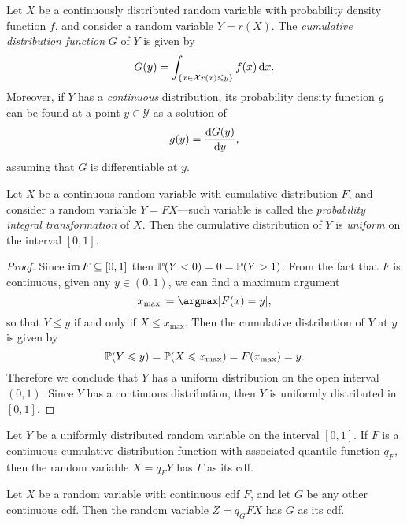\begin{proposition}
\label{prop:fn-of-rand-var-continuous-case}
Let \(X\) be a continuously distributed random variable with probability density
function \(f\), and consider a random variable \(Y = r(X)\). The
\emph{cumulative distribution function} \(G\) of \(Y\) is given by
\[
G(y) = \int_{\{x \in \mathcal{X} \relax r(x) \leqslant y\}} f(x)\, \mathrm{d} x.
\]
Moreover, if \(Y\) has a \emph{continuous} distribution, its probability
density function \(g\) can be found at a point \(y \in \mathcal{Y}\) as a solution of
\[
g(y) = \frac{\mathrm{d} G(y)}{\mathrm{d} y},
\]
assuming that \(G\) is differentiable at \(y\).
\end{proposition}

\begin{proposition}
\label{prop:probability-integral-transformation}
Let \(X\) be a continuous random variable with cumulative distribution \(F\),
and consider a random variable \(Y = F X\)---such variable is called the
\emph{probability integral transformation} of \(X\). Then the cumulative
distribution of \(Y\) is \emph{uniform} on the interval \([0, 1]\).
\end{proposition}

\begin{proof}
Since \(\operatorname{im} F \subseteq [0, 1]\) then \(\operatorname{\mathbb{P}}(Y < 0) = 0 = \operatorname{\mathbb{P}}(Y > 1)\). From
the fact that \(F\) is continuous, given any \(y \in (0, 1)\), we can find a
maximum argument
\[
x_{\text{max}} \coloneq \argmax [F(x) = y],
\]
so that \(Y \leq y\) if and only if \(X \leq x_{\text{max}}\). Then the
cumulative distribution of \(Y\) at \(y\) is given by
\[
\operatorname{\mathbb{P}}(Y \leqslant y) = \operatorname{\mathbb{P}}(X \leqslant x_{\text{max}}) = F(x_{\text{max}}) = y.
\]
Therefore we conclude that \(Y\) has a uniform distribution on the open interval
\((0, 1)\). Since \(Y\) has a continuous distribution, then \(Y\) is uniformly
distributed in \([0, 1]\).
\end{proof}

\begin{corollary}
\label{cor:}
Let \(Y\) be a uniformly distributed random variable on the interval \([0,
1]\). If \(F\) is a continuous cumulative distribution function with associated
quantile function \(q_F\), then the random variable \(X = q_F Y\) has \(F\) as
its cdf.
\end{corollary}

\begin{corollary}
\label{cor:choose-distribution}
Let \(X\) be a random variable with continuous cdf \(F\), and let \(G\) be any
other continuous cdf. Then the random variable \(Z = q_G F X\) has \(G\) as its
cdf.
\end{corollary}


